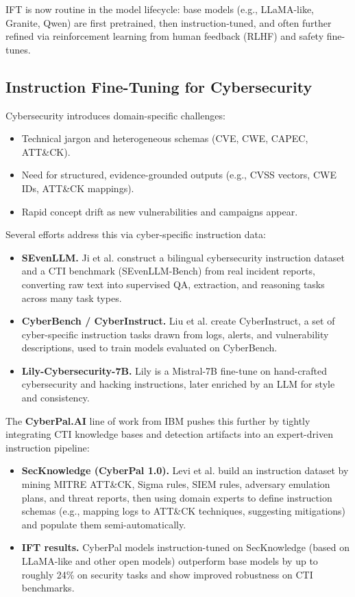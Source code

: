 \documentclass[sigconf]{acmart}
\begin{document}
IFT is now routine in the model lifecycle: base models (e.g., LLaMA-like, Granite, Qwen) are first pretrained, then instruction-tuned, and often further refined via reinforcement learning from human feedback (RLHF) and safety fine-tunes.\cite{ouyang2022instructgpt}

\subsection{Instruction Fine-Tuning for Cybersecurity}

Cybersecurity introduces domain-specific challenges:

\begin{itemize}
  \item Technical jargon and heterogeneous schemas (CVE, CWE, CAPEC, ATT\&CK).
  \item Need for structured, evidence-grounded outputs (e.g., CVSS vectors, CWE IDs, ATT\&CK mappings).
  \item Rapid concept drift as new vulnerabilities and campaigns appear.
\end{itemize}

Several efforts address this via cyber-specific instruction data:

\begin{itemize}
  \item \textbf{SEvenLLM.} Ji et al. construct a bilingual cybersecurity instruction dataset and a CTI benchmark (SEvenLLM-Bench) from real incident reports, converting raw text into supervised QA, extraction, and reasoning tasks across many task types.\cite{ji2024sevenllm}
  \item \textbf{CyberBench / CyberInstruct.} Liu et al. create CyberInstruct, a set of cyber-specific instruction tasks drawn from logs, alerts, and vulnerability descriptions, used to train models evaluated on CyberBench.\cite{liu2024cyberbench}
  \item \textbf{Lily-Cybersecurity-7B.} Lily is a Mistral-7B fine-tune on hand-crafted cybersecurity and hacking instructions, later enriched by an LLM for style and consistency.\cite{liu2024cyberbench}
\end{itemize}

The \textbf{CyberPal.AI} line of work from IBM pushes this further by tightly integrating CTI knowledge bases and detection artifacts into an expert-driven instruction pipeline:

\begin{itemize}
  \item \textbf{SecKnowledge (CyberPal 1.0).} Levi et al. build an instruction dataset by mining MITRE ATT\&CK, Sigma rules, SIEM rules, adversary emulation plans, and threat reports, then using domain experts to define instruction schemas (e.g., mapping logs to ATT\&CK techniques, suggesting mitigations) and populate them semi-automatically.\cite{levi2024cyberpal}
  \item \textbf{IFT results.} CyberPal models instruction-tuned on SecKnowledge (based on LLaMA-like and other open models) outperform base models by up to roughly 24\% on security tasks and show improved robustness on CTI benchmarks.\cite{levi2024cyberpal}
\end{itemize}
\end{document}
